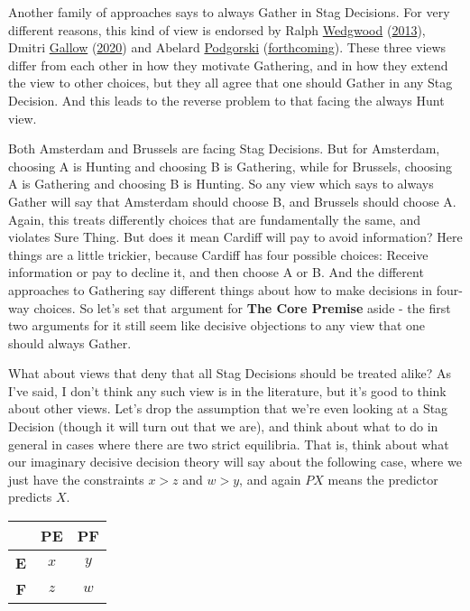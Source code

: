 \documentclass[
  12pt,
]{article}
\begin{document}
Another family of approaches says to always Gather in Stag Decisions.
For very different reasons, this kind of view is endorsed by Ralph
\protect\hyperlink{ref-Wedgwood2013}{Wedgwood}
(\protect\hyperlink{ref-Wedgwood2013}{2013}), Dmitri
\protect\hyperlink{ref-Gallow2020}{Gallow}
(\protect\hyperlink{ref-Gallow2020}{2020}) and Abelard
\protect\hyperlink{ref-Podgorski2022}{Podgorski}
(\protect\hyperlink{ref-Podgorski2022}{forthcoming}). These three views
differ from each other in how they motivate Gathering, and in how they
extend the view to other choices, but they all agree that one should
Gather in any Stag Decision. And this leads to the reverse problem to
that facing the always Hunt view.

Both Amsterdam and Brussels are facing Stag Decisions. But for
Amsterdam, choosing A is Hunting and choosing B is Gathering, while for
Brussels, choosing A is Gathering and choosing B is Hunting. So any view
which says to always Gather will say that Amsterdam should choose B, and
Brussels should choose A. Again, this treats differently choices that
are fundamentally the same, and violates Sure Thing. But does it mean
Cardiff will pay to avoid information? Here things are a little
trickier, because Cardiff has four possible choices: Receive information
or pay to decline it, and then choose A or B. And the different
approaches to Gathering say different things about how to make decisions
in four-way choices. So let's set that argument for \textbf{The Core
Premise} aside - the first two arguments for it still seem like decisive
objections to any view that one should always Gather.

What about views that deny that all Stag Decisions should be treated
alike? As I've said, I don't think any such view is in the literature,
but it's good to think about other views. Let's drop the assumption that
we're even looking at a Stag Decision (though it will turn out that we
are), and think about what to do in general in cases where there are two
strict equilibria. That is, think about what our imaginary decisive
decision theory will say about the following case, where we just have
the constraints \(x > z\) and \(w > y\), and again \(PX\) means the
predictor predicts \(X\).

\begin{table}[H]
\centering
\begin{tabular}[t]{>{}r|cc}

\textbf{ } & \textbf{PE} & \textbf{PF}\\
\midrule
\textbf{E} & $x$ & $y$\\
\textbf{F} & $z$ & $w$\\

\end{tabular}
\end{table}
\end{document}
